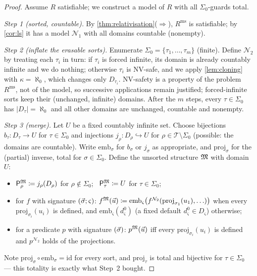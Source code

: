 \begin{proof}
Assume $R$ satisfiable; we construct a model of $R$ with all
$\Sigma_0$-guards total.

\emph{Step 1 (sorted, countable).}  By
\cref{thm:relativisation}($\Rightarrow$), $R^{\mathrm{ms}}$ is
satisfiable; by \cref{cor:ls} it has a model $\mathcal{N}_1$ with
all domains countable (nonempty).

\emph{Step 2 (inflate the erasable sorts).}  Enumerate $\Sigma_0 =
\{\tau_1, \ldots, \tau_m\}$ (finite).  Define $\mathcal{N}_2$ by
treating each $\tau_i$ in turn: if $\tau_i$ is forced infinite, its
domain is already countably infinite and we do nothing; otherwise
$\tau_i$ is NV-safe, and we apply \cref{lem:cloning} with $\kappa =
\aleph_0$, which changes only $D_{\tau_i}$.  NV-safety is a
property of the problem $R^{\mathrm{ms}}$, not of the model, so
successive applications remain justified; forced-infinite sorts
keep their (unchanged, infinite) domains.  After the $m$ steps,
every $\tau \in \Sigma_0$ has $|D_\tau| = \aleph_0$ and all other
domains are unchanged, countable and nonempty.

\emph{Step 3 (merge).}  Let $U$ be a fixed countably infinite set.
Choose bijections $b_\tau : D_\tau \to U$ for $\tau \in \Sigma_0$
and injections $j_\rho : D_\rho \hookrightarrow U$ for $\rho \in
\mathcal{T} \setminus \Sigma_0$ (possible: the domains are
countable).  Write $\mathrm{emb}_\sigma$ for $b_\sigma$ or
$j_\sigma$ as appropriate, and $\mathrm{proj}_\sigma$ for the
(partial) inverse, total for $\sigma \in \Sigma_0$.  Define the
unsorted structure $\mathfrak{M}$ with domain $U$:
\begin{itemize}
\item $\mathsf{P}_{\rho}^{\mathfrak{M}} \coloneqq j_\rho(D_\rho)$ for $\rho
  \notin \Sigma_0$; \ $\mathsf{P}_{\tau}^{\mathfrak{M}} \coloneqq U$ for $\tau
  \in \Sigma_0$;
\item for $f$ with signature $(\vec{\sigma}; \varsigma)$:
  $f^{\mathfrak{M}}(\vec{u}) \coloneqq
  \mathrm{emb}_\varsigma\bigl(f^{\mathcal{N}_2}(
  \mathrm{proj}_{\sigma_1}(u_1), \ldots)\bigr)$ when every
  $\mathrm{proj}_{\sigma_i}(u_i)$ is defined, and
  $\mathrm{emb}_\varsigma(d^0_\varsigma)$ (a fixed default
  $d^0_\varsigma \in D_\varsigma$) otherwise;
\item for a predicate $p$ with signature $(\vec{\sigma})$:
  $p^{\mathfrak{M}}(\vec{u})$ iff every $\mathrm{proj}_{\sigma_i}(u_i)$ is
  defined and $p^{\mathcal{N}_2}$ holds of the projections.
\end{itemize}
Note $\mathrm{proj}_\sigma \circ \mathrm{emb}_\sigma =
\mathrm{id}$ for every sort, and $\mathrm{proj}_\tau$ is total and
bijective for $\tau \in \Sigma_0$ --- this totality is exactly what
Step~2 bought.


\end{proof}
